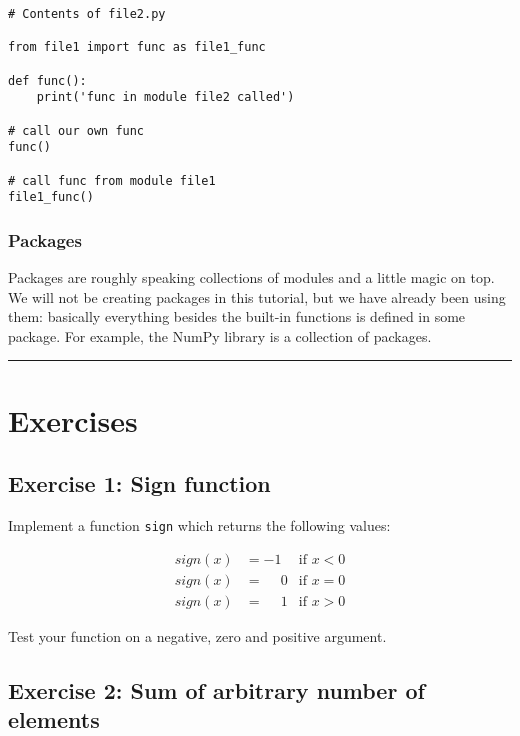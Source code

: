 \documentclass[10pt]{scrartcl}
\begin{document}
\begin{verbatim}
# Contents of file2.py

from file1 import func as file1_func

def func():
    print('func in module file2 called')

# call our own func
func()

# call func from module file1
file1_func()
\end{verbatim}

\hypertarget{packages}{%
\subsubsection{Packages}\label{packages}}

Packages are roughly speaking collections of modules and a little magic
on top. We will not be creating packages in this tutorial, but we have
already been using them: basically everything besides the built-in
functions is defined in some package. For example, the NumPy library is
a collection of packages.

    \begin{center}\rule{0.5\linewidth}{0.5pt}\end{center}

\hypertarget{exercises}{%
\section{Exercises}\label{exercises}}

\hypertarget{exercise-1-sign-function}{%
\subsection{Exercise 1: Sign function}\label{exercise-1-sign-function}}

Implement a function \texttt{sign} which returns the following values:

\begin{align}
sign(x) &= -1 & \text{if } x < 0 \\
sign(x) &= \phantom{-} 0 & \text{if } x = 0 \\
sign(x) &= \phantom{-} 1 & \text{if } x > 0
\end{align}

Test your function on a negative, zero and positive argument.

\hypertarget{exercise-2-sum-of-arbitrary-number-of-elements}{%
\subsection{Exercise 2: Sum of arbitrary number of
elements}\label{exercise-2-sum-of-arbitrary-number-of-elements}}
\end{document}
